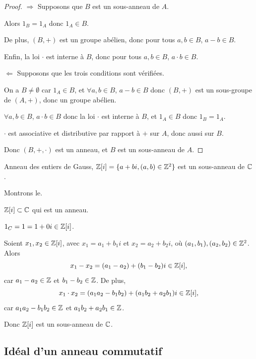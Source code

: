 \begin{proof} $\Rightarrow$ Supposons que $B$ est un sous-anneau de $A$.
    
    Alors $1_B = 1_A$ donc $1_A \in B$.

    De plus, $(B, +)$ est un groupe abélien, donc pour tous $a, b \in B$, $a - b \in B$.

    Enfin, la loi $\cdot$ est interne à $B$, donc pour tous $a, b \in B$, $a \cdot b \in B$.

    \avspace $\Leftarrow$ Supposons que les trois conditions sont vérifiées.

    On a $B \neq \emptyset$ car $1_A \in B$, et $\forall a, b \in B$, $a - b \in B$ donc $(B, +)$ est un sous-groupe de $(A, +)$,
    donc un groupe abélien.

    $\forall a, b \in B$, $a \cdot b \in B$ donc la loi $\cdot$ est interne à $B$, et 
    $1_A \in B$ donc $1_B = 1_A$.

    $\cdot$ est associative et distributive par rapport à $+$ sur $A$, donc aussi sur $B$.

    Donc $(B, +, \cdot)$ est un anneau, et $B$ est un sous-anneau de $A$.
\end{proof}

\begin{exemple}
    Anneau des entiers de Gauss, $\mathbb{Z}[i] = \{a + bi , (a, b) \in \mathbb{Z}^2\}$ est un sous-anneau de $\mathbb{C}$.

    Montrons le. 

    $\mathbb{Z}[i] \subset \mathbb{C}$ qui est un anneau.

    $1_C = 1 = 1 + 0i \in \mathbb{Z}[i]$.

    Soient $x_1, x_2 \in \mathbb{Z}[i]$, avec $x_1 = a_1 + b_1 i$ et $x_2 = a_2 + b_2 i$,
    où $(a_1, b_1), (a_2, b_2) \in \mathbb{Z}^2$.
    Alors
    \[
        x_1 - x_2 = (a_1 - a_2) + (b_1 - b_2)i \in \mathbb{Z}[i],
    \]
    car $a_1 - a_2 \in \mathbb{Z}$ et $b_1 - b_2 \in \mathbb{Z}$.
    De plus,
    \[
        x_1 \cdot x_2 = (a_1 a_2 - b_1 b_2) + (a_1 b_2 + a_2 b_1)i \in \mathbb{Z}[i],
    \]
    car $a_1 a_2 - b_1 b_2 \in \mathbb{Z}$ et $a_1 b_2 + a_2 b_1 \in \mathbb{Z}$.

    Donc $\mathbb{Z}[i]$ est un sous-anneau de $\mathbb{C}$.
\end{exemple}

\subsection{Idéal d'un anneau commutatif }


